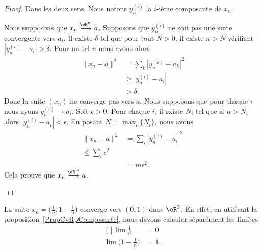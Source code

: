 \begin{proof}
	Dans les deux sens. Nous notons \( y_n^{(i)}\) la \( i\)-ième composante de \( x_n\).
	\begin{subproof}
		\spitem[\( \Rightarrow\)]
		Nous supposons que \( x_n\stackrel{ \eR^m}{\longrightarrow} a\). Supposons que \( y_n^{(i)}\) ne soit pas une suite convergente vers \( a_i\). Il existe \( \delta\) tel que pour tout \( N>0\), il existe \( n>N\) vérifiant \( | y_n^{(i)}-a_i |>\delta\). Pour un tel \( n\) nous avons alors
		\begin{subequations}
			\begin{align}
				\| x_n-a \|^2 & =\sum_k| y_n^{(k)}-a_k   |^2 \\
				              & \geq | y_n^{(i)}-a_i |       \\
				              & >\delta.
			\end{align}
		\end{subequations}
		Donc la suite \( (x_n)\) ne converge pas vers \( a\).
		\spitem[\( \Leftarrow\)]
		Nous supposons que pour chaque \( i\) nous ayons \( y_n^{(i)}\to a_i\). Soit \( \epsilon>0\). Pour chaque \( i\), il existe \( N_i\) tel que si \( n>N_i\) alors \(  | y_n^{(i)}-a_i |<\epsilon\). En posant \( N=\max_i\{ N_i \}\), nous avons
		\begin{subequations}
			\begin{align}
				\| x_n-a \|^2 & =\sum_i| y_n^{(i)}-a_i |^2 \\
				\leq \sum_i\epsilon^2                      \\
				              & =m\epsilon^2.
			\end{align}
		\end{subequations}
		Cela prouve que \( x_n\stackrel{ \eR^m}{\longrightarrow} a\).
	\end{subproof}
\end{proof}

\begin{example}
	La suite \( x_n=\big( \frac{1}{ n },1-\frac{1}{ n } \big)\) converge vers \( (0,1)\) dans \( \eR^2\). En effet, en utilisant la proposition~\ref{PropCvRpComposante}, nous devons calculer séparément les limites
	\begin{equation}
		\begin{aligned}[]
			\lim\frac{1}{ n }               & =0  \\
			\lim\big( 1-\frac{1}{ n } \big) & =1.
		\end{aligned}
	\end{equation}
\end{example}

